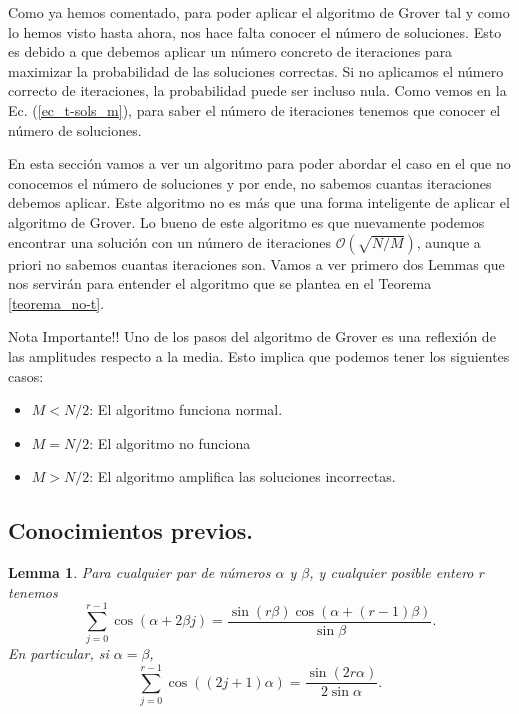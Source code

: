 \documentclass[a4paper,11pt]{article} %
\newtheorem{lemma}{Lemma}
\numberwithin{equation}{section}
\def\lp{\left(}
\def\rp{\right)}
\begin{document}
Como ya hemos comentado, para poder aplicar el algoritmo de Grover tal y como lo hemos visto hasta ahora, nos hace falta conocer el número de soluciones. Esto es debido a que debemos aplicar un número concreto de iteraciones para maximizar la probabilidad de las soluciones correctas. Si no aplicamos el número correcto de iteraciones, la probabilidad puede ser incluso nula. Como vemos en la Ec. (\ref{ec_t-sols_m}), para saber el número de iteraciones tenemos que conocer el número de soluciones. 

En esta sección vamos a ver un algoritmo para poder abordar el caso en el que no conocemos el número de soluciones y por ende, no sabemos cuantas iteraciones debemos aplicar. Este algoritmo no es más que una forma inteligente de aplicar el algoritmo de Grover. Lo bueno de este algoritmo es que nuevamente podemos encontrar una solución con un número de iteraciones $\mathcal{O}( \sqrt{N/M} )$, aunque a priori no sabemos cuantas iteraciones son. Vamos a ver primero dos Lemmas que nos servirán para entender el algoritmo que se plantea en el Teorema \ref{teorema_no-t}.

	\begin{mybox}{Nota Importante!!}
	Uno de los pasos del algoritmo de Grover es una reflexión de las amplitudes respecto a la media. 
	Esto implica que podemos tener los siguientes casos:
	\begin{itemize}
		\item $M < N/2$: El algoritmo funciona normal.
		
		\item $M = N/2$: El algoritmo no funciona
		
		\item $M > N/2$: El algoritmo amplifica las soluciones incorrectas.
	\end{itemize}
	\end{mybox}


\subsection{Conocimientos previos.}

\begin{lemma}  \label{lemma_suma_cos}
Para cualquier par de números $\alpha$ y $\beta$, y cualquier posible entero $r$ tenemos
\begin{equation}
\sum_{j=0}^{r-1} \cos \lp \alpha + 2 \beta j \rp = \frac{\sin \lp r \beta \rp \cos (\alpha + (r-1) \beta)}{\sin \beta}.
\end{equation}
En particular, si $\alpha = \beta$,
\begin{equation}
\sum^{r-1}_{j=0} \cos \lp \lp 2 j + 1 \rp \alpha \rp = \frac{\sin \lp 2 r \alpha \rp}{2 \sin \alpha}.
\end{equation}
\end{lemma}
\end{document}
